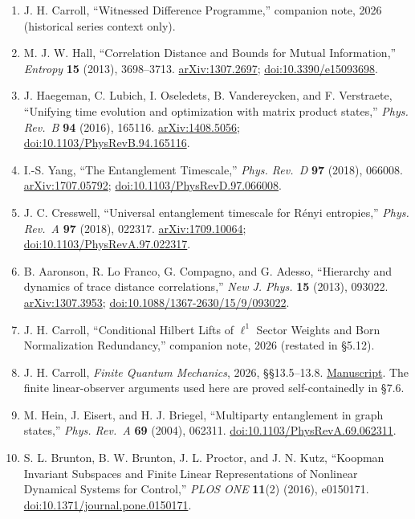 \documentclass[
  11pt,
]{article}
\begin{document}
\begin{enumerate}
\item
  J. H. Carroll, ``Witnessed Difference Programme,'' companion note, 2026 (historical series context only).
\item
  M. J. W. Hall, ``Correlation Distance and Bounds for Mutual Information,'' \emph{Entropy} \textbf{15} (2013), 3698--3713. \href{https://arxiv.org/abs/1307.2697}{arXiv:1307.2697}; \href{https://doi.org/10.3390/e15093698}{doi:10.3390/e15093698}.
\item
  J. Haegeman, C. Lubich, I. Oseledets, B. Vandereycken, and F. Verstraete, ``Unifying time evolution and optimization with matrix product states,'' \emph{Phys. Rev.~B} \textbf{94} (2016), 165116. \href{https://arxiv.org/abs/1408.5056}{arXiv:1408.5056}; \href{https://doi.org/10.1103/PhysRevB.94.165116}{doi:10.1103/PhysRevB.94.165116}.
\item
  I.-S. Yang, ``The Entanglement Timescale,'' \emph{Phys. Rev.~D} \textbf{97} (2018), 066008. \href{https://arxiv.org/abs/1707.05792}{arXiv:1707.05792}; \href{https://doi.org/10.1103/PhysRevD.97.066008}{doi:10.1103/PhysRevD.97.066008}.
\item
  J. C. Cresswell, ``Universal entanglement timescale for Rényi entropies,'' \emph{Phys. Rev.~A} \textbf{97} (2018), 022317. \href{https://arxiv.org/abs/1709.10064}{arXiv:1709.10064}; \href{https://doi.org/10.1103/PhysRevA.97.022317}{doi:10.1103/PhysRevA.97.022317}.
\item
  B. Aaronson, R. Lo Franco, G. Compagno, and G. Adesso, ``Hierarchy and dynamics of trace distance correlations,'' \emph{New J. Phys.} \textbf{15} (2013), 093022. \href{https://arxiv.org/abs/1307.3953}{arXiv:1307.3953}; \href{https://doi.org/10.1088/1367-2630/15/9/093022}{doi:10.1088/1367-2630/15/9/093022}.
\item
  J. H. Carroll, ``Conditional Hilbert Lifts of \(\ell^1\) Sector Weights and Born Normalization Redundancy,'' companion note, 2026 (restated in §5.12).
\item
  J. H. Carroll, \emph{Finite Quantum Mechanics}, 2026, §§13.5--13.8. \href{https://github.com/dbccpage/theory_of_finite_quantum_mechanics}{Manuscript}. The finite linear-observer arguments used here are proved self-containedly in §7.6.
\item
  M. Hein, J. Eisert, and H. J. Briegel, ``Multiparty entanglement in graph states,'' \emph{Phys. Rev.~A} \textbf{69} (2004), 062311. \href{https://doi.org/10.1103/PhysRevA.69.062311}{doi:10.1103/PhysRevA.69.062311}.
\item
  S. L. Brunton, B. W. Brunton, J. L. Proctor, and J. N. Kutz, ``Koopman Invariant Subspaces and Finite Linear Representations of Nonlinear Dynamical Systems for Control,'' \emph{PLOS ONE} \textbf{11}(2) (2016), e0150171. \href{https://doi.org/10.1371/journal.pone.0150171}{doi:10.1371/journal.pone.0150171}.

\end{enumerate}
\end{document}
